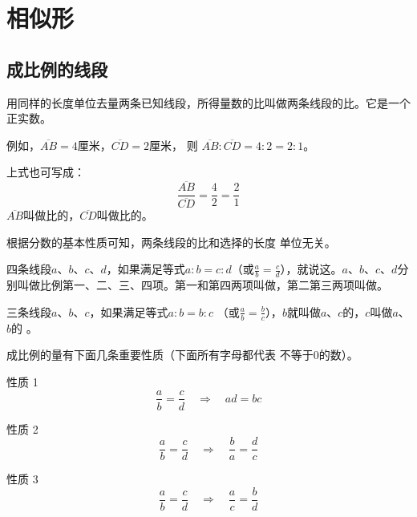 \section{相似形}
\subsection{成比例的线段}

\begin{Definition}
用同样的长度单位去量两条已知线段，所得量数的比叫做两条线段的比。它是一个正实数。  
\end{Definition}

例如，$\overline{AB}=4$厘米，$\overline{CD}=2$厘米，
则 $\overline{AB}:\overline{CD}=4:2=2:1$。

上式也可写成：
\[\frac{\overline{AB}}{\overline{CD}}=\frac{4}{2}=\frac{2}{1}\]
$\overline{AB}$叫做比的，$\overline{CD}$叫做比的。

根据分数的基本性质可知，两条线段的比和选择的长度
单位无关。


\begin{Definition}
四条线段$a$、$b$、$c$、$d$，如果满足等式$a:b=c:d$（或$\frac{a}{b}=\frac{c}{d}$），就说这。$a$、$b$、$c$、$d$分别叫做比例第一、二、三、四项。第一和第四两项叫做，第二第三两项叫做。
\end{Definition}

\begin{Definition}
三条线段$a$、$b$、$c$，如果满足等式$a:b=b:c$
（或$\frac{a}{b}=\frac{b}{c}$），$b$就叫做$a$、$c$的，$c$叫做$a$、$b$的
。
\end{Definition}

成比例的量有下面几条重要性质（下面所有字母都代表
不等于0的数）。

\begin{Theorem}[比例的基本性质]{性质 1}
\[\frac{a}{b}=\frac{c}{d}\quad \Rightarrow\quad ad=bc\]    
\end{Theorem}

\begin{Theorem}[反比定理]{性质 2}
    \[\frac{a}{b}=\frac{c}{d}\quad \Rightarrow\quad \frac{b}{a}=\frac{d}{c}\]       
\end{Theorem}

\begin{Theorem}[更比定理]{性质 3}
    \[\frac{a}{b}=\frac{c}{d}\quad \Rightarrow\quad \frac{a}{c}=\frac{b}{d}\] 
\end{Theorem}

